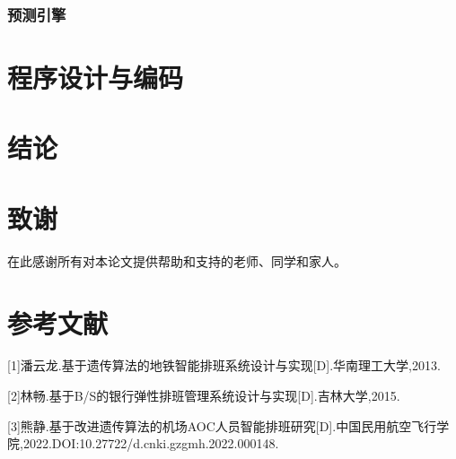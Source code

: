 \documentclass{ctexart}
\begin{document}
\subsubsection{预测引擎}

\section{程序设计与编码}

\section{结论}

\section*{致谢}
在此感谢所有对本论文提供帮助和支持的老师、同学和家人。

\section*{参考文献}
[1]潘云龙.基于遗传算法的地铁智能排班系统设计与实现[D].华南理工大学,2013.

[2]林畅.基于B/S的银行弹性排班管理系统设计与实现[D].吉林大学,2015.

[3]熊静.基于改进遗传算法的机场AOC人员智能排班研究[D].中国民用航空飞行学院,2022.DOI:10.27722/d.cnki.gzgmh.2022.000148.

\appendix
{}

\end{document}
